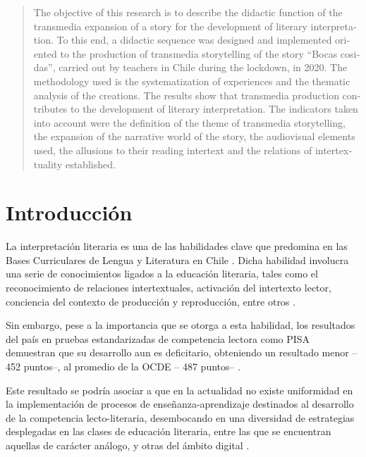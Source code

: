 \documentclass[spanish]{textolivre}
\begin{document}
\begin{polyabstract}
\begin{english}
\begin{abstract}
The objective of this research is to describe the didactic function of the transmedia expansion of a story for the development of literary interpretation. To this end, a didactic sequence was designed and implemented oriented to the production of transmedia storytelling of the story “Bocas cosidas”, carried out by teachers in Chile during the lockdown, in 2020. The methodology used is the systematization of experiences and the thematic analysis of the creations. The results show that transmedia production contributes to the development of literary interpretation. The indicators taken into account were the definition of the theme of transmedia storytelling, the expansion of the narrative world of the story, the audiovisual elements used, the allusions to their reading intertext and the relations of intertextuality established.

\end{abstract}
\end{english}
\end{polyabstract}

\section{Introducción}\label{sec-intro}
La interpretación literaria es una de las habilidades clave que predomina en las Bases Curriculares de Lengua y Literatura en Chile \cite{ministerio_de_educacion_bases_2015,ministerio_de_educacion_bases_2019}. Dicha habilidad involucra una serie de conocimientos ligados a la educación literaria, tales como el reconocimiento de relaciones intertextuales, activación del intertexto lector, conciencia del contexto de producción y reproducción, entre otros \cite{mendoza_fillola_lectura_1995,mendoza_fillola_tu_1998,ministerio_de_educacion_bases_2019}. 

Sin embargo, pese a la importancia que se otorga a esta habilidad, los resultados del país en pruebas estandarizadas de competencia lectora como PISA demuestran que su desarrollo aun es deficitario, obteniendo un resultado menor –452 puntos–, al promedio de la OCDE – 487 puntos– \cite{agencia_de_calidad_de_la_educacion_pisa_2019}. 

Este resultado se podría asociar a que en la actualidad no existe uniformidad en la implementación de procesos de enseñanza-aprendizaje destinados al desarrollo de la competencia lecto-literaria, desembocando en una diversidad de estrategias desplegadas en las clases de educación literaria, entre las que se encuentran aquellas de carácter análogo, y otras del ámbito digital \cite{suazo_munoz_aproximacion_2022}. 
\end{document}
